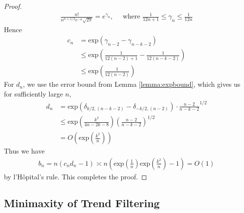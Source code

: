 \documentclass[a4paper]{article}
\begin{document}
\begin{proof}
\begin{align*}
\frac{n!}{n^{n+1/2}e^{-n}\sqrt{2\pi}} = e^{\gamma_n}, \quad \text{ where } \frac{1}{12n+1}\leq \gamma_n \leq \frac{1}{12n}
\end{align*}
Hence 
\begin{align*}
c_n &= \mbox{exp}(\gamma_{n-2} - \gamma_{n-k-2})\\ 
&\leq \mbox{exp}(\frac{1}{12(n-2)+1} - \frac{1}{12(n-k-2)})\\
&\leq \mbox{exp}(\frac{1}{12(n-2)})
\end{align*}
For $d_n$, we use the error bound from Lemma \ref{lemma:expbound}, which gives us for sufficiently large $n$,
\begin{align*}
d_n &= \mbox{exp}(\delta_{k/2, (n-k-2)} - \delta_{-k/2, (n-2)})\cdot\frac{n-2}{n-k-2}^{1/2}\\
&\leq \mbox{exp}(\frac{k^2}{4n-2k-8})(\frac{n-2}{n-k-2})^{1/2}\\
&= O(\mbox{exp}(\frac{k^2}{n}))
\end{align*}
Thus we have
\begin{align*}
b_n = n(c_nd_n - 1) \asymp n(\mbox{exp}(\frac{1}{n})\mbox{exp}(\frac{k^2}{n}) - 1) = O(1)
\end{align*}
by l'H\^opital's rule. This completes the proof.
\end{proof}

\subsection{Minimaxity of Trend Filtering}
\end{document}
